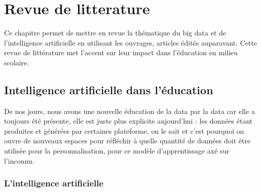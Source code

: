 \chapter{Revue de litterature}

	Ce chapitre permet de mettre en revue la thématique du big data et de l’intelligence artificielle en utilisant les ouvrages, articles édités auparavant. Cette revue de littérature met l’accent sur leur impact  dans l’éducation en milieu scolaire.
	
\section{Intelligence artificielle dans l’éducation }

De nos jours, nous avons une nouvelle éducation de la data par la data car elle a toujours été présente, elle est juste plus explicite aujourd’hui : les données étant produites et générées par certaines plateforme, on le sait et c’est pourquoi on ouvre de nouveaux espaces pour réfléchir à quelle quantité de données doit être utilisée pour la personnalisation, pour ce modèle d’apprentissage axé sur l’inconnu. 

\subsection{L’intelligence artificielle}

